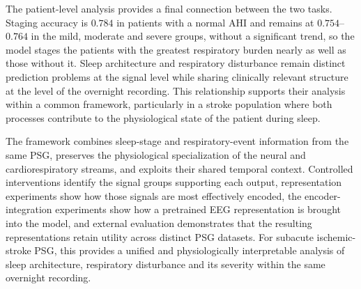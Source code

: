 \documentclass[a4paper,fleqn]{cas-sc}
\begin{document}
The patient-level analysis provides a final connection between the two tasks.
Staging accuracy is $0.784$ in patients with a normal AHI and remains at $0.754$--$0.764$ in
the mild, moderate and severe groups, without a significant trend, so the model stages the
patients with the greatest respiratory burden nearly as well as those without it. Sleep
architecture and respiratory disturbance remain distinct prediction problems at the signal
level while sharing clinically relevant structure at the level of the overnight recording.
This relationship supports their analysis within a common framework, particularly in a stroke
population where both processes contribute to the physiological state of the patient during
sleep.

The framework combines sleep-stage and respiratory-event information
from the same PSG, preserves the physiological specialization of the neural and
cardiorespiratory streams, and exploits their shared temporal context.
Controlled interventions identify the signal groups supporting each output,
representation experiments show how those signals are most effectively encoded,
the encoder-integration experiments show how a pretrained EEG representation is brought into
the model, and external evaluation demonstrates that the resulting representations retain
utility across distinct PSG datasets. For subacute ischemic-stroke PSG, this
provides a unified and physiologically interpretable analysis of sleep
architecture, respiratory disturbance and its severity within the same overnight recording.

\end{document}
